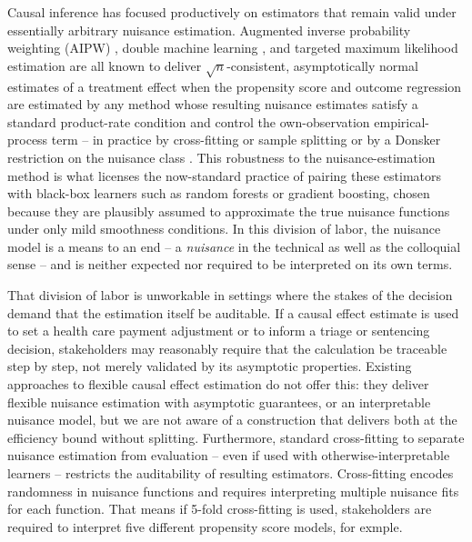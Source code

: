 \documentclass[12pt]{article}
\begin{document}
Causal inference has focused productively on estimators that remain valid under essentially arbitrary nuisance estimation. Augmented inverse probability weighting (AIPW) \citep{robins1994,bang2005}, double machine learning \citep{chernozhukov2018}, and targeted maximum likelihood estimation \citep{vanderLaanTargetedLearningCausal2011} are all known to deliver $\sqrt n$-consistent, asymptotically normal estimates of a treatment effect when the propensity score and outcome regression are estimated by any method whose resulting nuisance estimates satisfy a standard product-rate condition and control the own-observation empirical-process term -- in practice by cross-fitting or sample splitting or by a Donsker restriction on the nuisance class \citep{kennedy2016semiparametric}. This robustness to the nuisance-estimation method is what licenses the now-standard practice of pairing these estimators with black-box learners such as random forests or gradient boosting, chosen because they are plausibly assumed to approximate the true nuisance functions under only mild smoothness conditions. In this division of labor, the nuisance model is a means to an end -- a \emph{nuisance} in the technical as well as the colloquial sense -- and is neither expected nor required to be interpreted on its own terms.

That division of labor is unworkable in settings where the stakes of the decision demand that the estimation itself be auditable. If a causal effect estimate is used to set a health care payment adjustment or to inform a triage or sentencing decision, stakeholders may reasonably require that the calculation be traceable step by step, not merely validated by its asymptotic properties. Existing approaches to flexible causal effect estimation do not offer this: they deliver flexible nuisance estimation with asymptotic guarantees, or an interpretable nuisance model, but we are not aware of a construction that delivers both at the efficiency bound without splitting. Furthermore, standard cross-fitting to separate nuisance estimation from evaluation -- even if used with otherwise-interpretable learners -- restricts the auditability of resulting estimators. Cross-fitting encodes randomness in nuisance functions and requires interpreting multiple nuisance fits for each function. That means if 5-fold cross-fitting is used, stakeholders are required to interpret five different propensity score models, for exmple.
\end{document}
